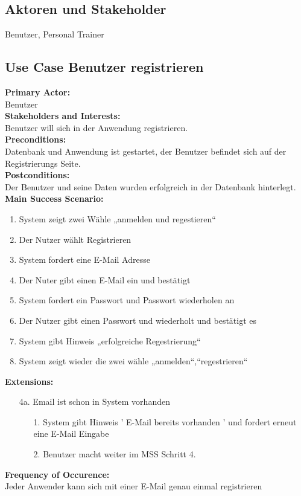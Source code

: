 \documentclass[12pt,a4paper,onecolumn]{article}
\begin{document}
\subsection{Aktoren und Stakeholder}
Benutzer, Personal Trainer
\subsection{Use Case Benutzer registrieren}
\textbf{Primary Actor:}\\ Benutzer\\
\textbf{Stakeholders and Interests:}\\Benutzer will sich in der Anwendung registrieren.\\
\textbf{Preconditions:} \\Datenbank und Anwendung ist gestartet, der Benutzer befindet sich auf der Registrierungs Seite.\\
\textbf{Postconditions:}\\ Der Benutzer und seine Daten wurden erfolgreich in der Datenbank hinterlegt.\\
\textbf{Main Success Scenario:}
\begin{enumerate}
    \item System zeigt zwei Wähle „anmelden und regestieren“
    \item Der Nutzer wählt Registrieren
    \item System fordert eine E-Mail Adresse
    \item Der Nuter gibt einen E-Mail ein und bestätigt
    \item System fordert ein Passwort und Passwort wiederholen an
    \item Der Nutzer gibt einen Passwort und wiederholt und bestätigt es
    \item System gibt Hinweis „erfolgreiche Regestrierung“
    \item System zeigt wieder die zwei wähle „anmelden“,“regestrieren“
\end{enumerate}
\textbf{Extensions:}
\begin{enumerate}
    \item [4a.]  Email ist schon in System vorhanden
    \begin{enumerate}
        \item[1.]System gibt Hinweis ' E-Mail bereits vorhanden ' und fordert erneut eine E-Mail Eingabe
        \item[2.]Benutzer macht weiter im MSS Schritt 4.
    \end{enumerate}
\end{enumerate}
\textbf{Frequency of Occurence:} \\Jeder Anwender kann sich mit einer E-Mail genau einmal registrieren\\
\end{document}
